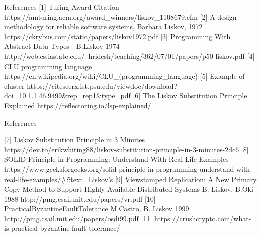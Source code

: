 \documentclass{beamer}
\begin{document}
\begin{frame}{References}
[1] {Turing Award Citation}
https://amturing.acm.org/award_winners/liskov_1108679.cfm
\newline
\vspace{1mm}
[2] {A  design  methodology  for  reliable  software   systems, Barbara Liskov, 1972} https://ckrybus.com/static/papers/liskov1972.pdf
\newline
\vspace{1mm}
[3] {Programming With Abstract Data Types - B.Liskov 1974}
http://web.cs.iastate.edu/~hridesh/teaching/362/07/01/papers/p50-liskov.pdf
\newline
\vspace{1mm}
[4] {CLU programming language} {https://en.wikipedia.org/wiki/CLU_(programming_language)}
\newline
\vspace{1mm}
[5] {Example of cluster} 
\newline
https://citeseerx.ist.psu.edu/viewdoc/download?doi=10.1.1.46.9499\&rep=rep1\&type=pdf
\newline
\vspace{1mm}
[6] {The Liskov Substitution Principle Explained} https://reflectoring.io/lsp-explained/


\end{frame}

\begin{frame}{References}

[7] {Liskov Substitution Principle in 3 Minutes}
https://dev.to/erikwhiting88/liskov-substitution-principle-in-3-minutes-2dc6
\newline
\vspace{1mm}
[8] {SOLID Principle in Programming: Understand With Real Life         Examples}
https://www.geeksforgeeks.org/solid-principle-in-programming-understand-with-real-life-examples/\#:\~:text=Liskov's%
\newline
\vspace{1mm}
[9] {Viewstamped Replication: A New Primary Copy Method to Support     Highly-Available Distributed Systems B. Liskov, B.Oki 1988}
http://pmg.csail.mit.edu/papers/vr.pdf
\newline
\vspace{1mm}
[10] {PracticalByzantineFaultTolerance M.Castro, B. Liskov 1999} http://pmg.csail.mit.edu/papers/osdi99.pdf
\newline
\vspace{1mm}
[11] https://crushcrypto.com/what-is-practical-byzantine-fault-tolerance/


\end{frame}
\end{document}
